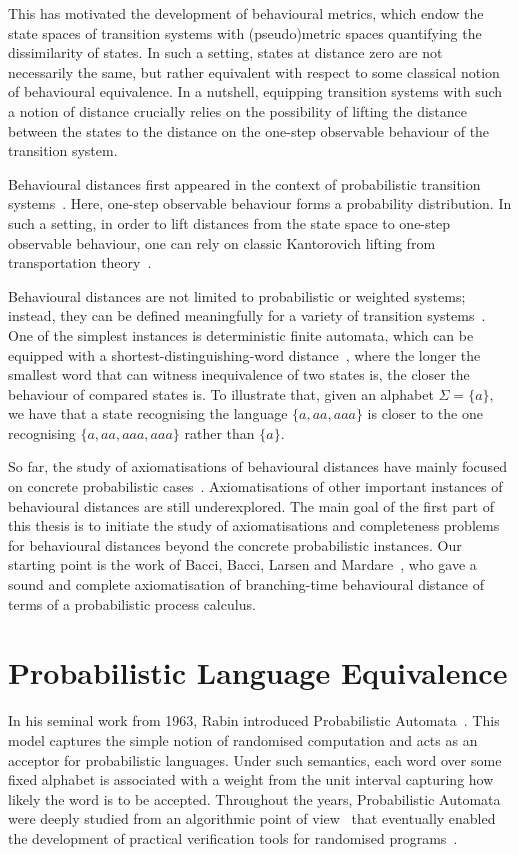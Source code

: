This has motivated the development of behavioural metrics, which endow the state spaces of transition systems with (pseudo)metric spaces quantifying the dissimilarity of states. In such a setting, states at distance zero are not necessarily the same, but rather equivalent with respect to some classical notion of behavioural equivalence. In a nutshell, equipping transition systems with such a notion of distance crucially relies on the possibility of lifting the distance between the states to the distance on the one-step observable behaviour of the transition system.

Behavioural distances first appeared in the context of probabilistic transition systems~\cite{Desharnais:2004:Metrics,Breugel:2001:Towards}. Here, one-step observable behaviour forms a probability distribution. In such a setting, in order to lift distances from the state space to one-step observable behaviour, one can rely on classic Kantorovich lifting from transportation theory~\cite{Villani:2009:Optimal}. 

Behavioural distances are not limited to probabilistic or weighted systems; instead, they can be defined meaningfully for a variety of transition systems~\cite{Baldan:2018:Coalgebraic}. One of the simplest instances is deterministic finite automata, which can be equipped with a shortest-distinguishing-word distance~\cite{Bonchi:2018:UpTo}, where the longer the smallest word that can witness inequivalence of two states is, the closer the behaviour of compared states is. To illustrate that, given an alphabet $\Sigma = \{a\}$, we have that a state recognising the language $\{a,aa, aaa\}$ is closer to the one recognising $\{a,aa,aaa,aaa\}$ rather than $\{a\}$. 

So far, the study of axiomatisations of behavioural distances have mainly focused on concrete probabilistic cases~\cite{Bacci:2018:Bisimilarity,Bacci:2018:TV,Bacci:2018:Algebraic}. Axiomatisations of other important instances of behavioural distances are still underexplored. The main goal of the first part of this thesis is to initiate the study of axiomatisations and completeness problems for behavioural distances beyond the concrete probabilistic instances. Our starting point is the work of Bacci, Bacci, Larsen and Mardare~\cite{Bacci:2018:Bisimilarity}, who gave a sound and complete axiomatisation of branching-time behavioural distance of terms of a probabilistic process calculus.

\section{Probabilistic Language Equivalence}
In his seminal work from 1963, Rabin introduced Probabilistic Automata~\cite{Rabin:1963:Probabilistic}. This model captures the simple notion of randomised computation and acts as an acceptor for probabilistic languages. Under such semantics, each word over some fixed alphabet is associated with a weight from the unit interval capturing how likely the word is to be accepted. Throughout the years, Probabilistic Automata were deeply studied from an algorithmic point of view~\cite{Kiefer:2011:Language} that eventually enabled the development of practical verification tools for randomised programs~\cite{Kiefer:2012:APEX}. 

